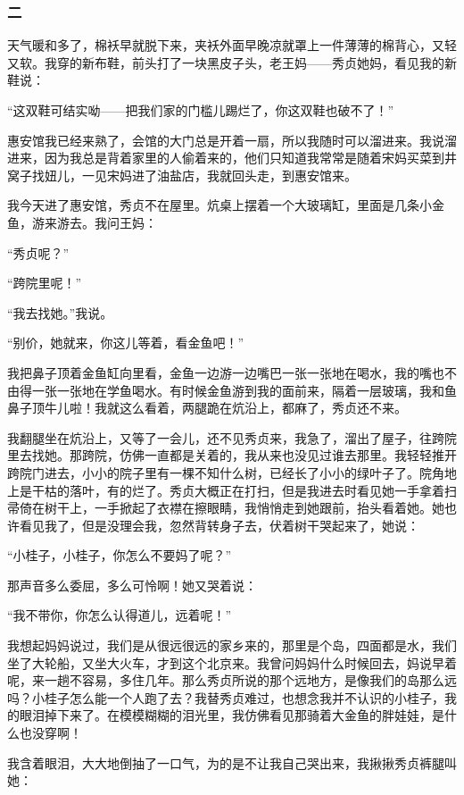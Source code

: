\subsubsection*{二}

\par 天气暖和多了，棉袄早就脱下来，夹袄外面早晚凉就罩上一件薄薄的棉背心，又轻又软。我穿的新布鞋，前头打了一块黑皮子头，老王妈——秀贞她妈，看见我的新鞋说：
\par “这双鞋可结实呦——把我们家的门槛儿踢烂了，你这双鞋也破不了！”
\par 惠安馆我已经来熟了，会馆的大门总是开着一扇，所以我随时可以溜进来。我说溜进来，因为我总是背着家里的人偷着来的，他们只知道我常常是随着宋妈买菜到井窝子找妞儿，一见宋妈进了油盐店，我就回头走，到惠安馆来。
\par 我今天进了惠安馆，秀贞不在屋里。炕桌上摆着一个大玻璃缸，里面是几条小金鱼，游来游去。我问王妈：
\par “秀贞呢？”
\par “跨院里呢！”
\par “我去找她。”我说。
\par “别价，她就来，你这儿等着，看金鱼吧！”
\par 我把鼻子顶着金鱼缸向里看，金鱼一边游一边嘴巴一张一张地在喝水，我的嘴也不由得一张一张地在学鱼喝水。有时候金鱼游到我的面前来，隔着一层玻璃，我和鱼鼻子顶牛儿啦！我就这么看着，两腿跪在炕沿上，都麻了，秀贞还不来。
\par 我翻腿坐在炕沿上，又等了一会儿，还不见秀贞来，我急了，溜出了屋子，往跨院里去找她。那跨院，仿佛一直都是关着的，我从来也没见过谁去那里。我轻轻推开跨院门进去，小小的院子里有一棵不知什么树，已经长了小小的绿叶子了。院角地上是干枯的落叶，有的烂了。秀贞大概正在打扫，但是我进去时看见她一手拿着扫帚倚在树干上，一手掀起了衣襟在擦眼睛，我悄悄走到她跟前，抬头看着她。她也许看见我了，但是没理会我，忽然背转身子去，伏着树干哭起来了，她说：
\par “小桂子，小桂子，你怎么不要妈了呢？”
\par 那声音多么委屈，多么可怜啊！她又哭着说：
\par “我不带你，你怎么认得道儿，远着呢！”
\par 我想起妈妈说过，我们是从很远很远的家乡来的，那里是个岛，四面都是水，我们坐了大轮船，又坐大火车，才到这个北京来。我曾问妈妈什么时候回去，妈说早着呢，来一趟不容易，多住几年。那么秀贞所说的那个远地方，是像我们的岛那么远吗？小桂子怎么能一个人跑了去？我替秀贞难过，也想念我并不认识的小桂子，我的眼泪掉下来了。在模模糊糊的泪光里，我仿佛看见那骑着大金鱼的胖娃娃，是什么也没穿啊！
\par 我含着眼泪，大大地倒抽了一口气，为的是不让我自己哭出来，我揪揪秀贞裤腿叫她：
